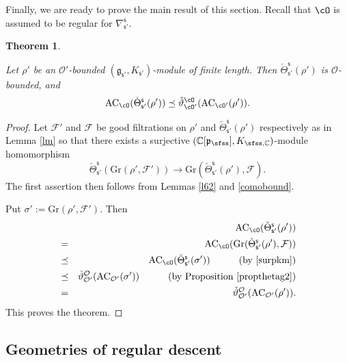 \documentclass[12pt,a4paper]{amsart}
\newcommand{\CF}{{\mathcal {F}}}
\newcommand{\CO}{{\mathcal {O}}}
\newcommand{\g}{\mathfrak g}
\newcommand{\p}{\mathfrak p}
\def\DD{\nabla}
\newcommand{\be}{\begin {equation}}
\newcommand{\ee}{\end {equation}}
\numberwithin{equation}{section}
\newtheorem{thm}{Theorem}[section]
\theoremstyle{remark}
\def\UU{\rU}
\def\cOp{\cO^{\prime}}
\begin{document}
Finally, we are ready to prove the main result of this section. Recall that  $\cO$ is assumed to be  regular  for $\DD_{\mathsf s'}^{\mathsf s}$.
\begin{thm}\label{prop:GDS.AC}

  Let $\rho'$ be an $\CO'$-bounded $(\g_{\mathsf s'}, K_{\mathsf s'})$-module of finite length. Then  $\check \Theta_{\mathsf s'}^{\mathsf s}(\rho')$ is $\CO$-bounded, and
    \[
    \mathrm{AC}_{\cO}(\check \Theta_{\mathsf s'}^{\mathsf s}(\rho'))\preceq \check \vartheta_{\cO'}^\cO(\mathrm{AC}_{\cO'}(\rho')).
  \]
\end{thm}
\begin{proof}
Let $\CF'$ and $\CF$ be  good filtrations  on $\rho'$ and  $\check \Theta_{\mathsf s'}^{\mathsf s}(\rho')$ respectively as in Lemma \ref{lm} so that there exists a
 surjective $(\C[\p_{\sfss}], K_{\sfss, \C})$-module homomorphism
\be\label{surpkm}
  \check \Theta_{\mathsf s'}^{\mathsf s}(\mathrm{Gr}(\rho',\CF')) \rightarrow \mathrm{Gr}(\check \Theta_{\mathsf s'}^{\mathsf s}(\rho'),\CF).
\ee
The first assertion then follows from Lemmas \ref{l62} and \ref{comobound}.

Put $\sigma':=\mathrm{Gr}(\rho',\CF')$.
Then
\begin{eqnarray*}
      && \mathrm{AC}_{\cO}(\check \Theta_{\mathsf s'}^{\mathsf s}(\rho'))\\
      &=&  \mathrm{AC}_{\cO}(\mathrm{Gr}(\check \Theta_{\mathsf s'}^{\mathsf s}(\rho'),\CF))\\
             &\preceq& \mathrm{AC}_{\cO}(\check \Theta_{\mathsf s'}^{\mathsf s}(\sigma')) \quad \qquad (\textrm{by \eqref{surpkm}})\\
          &  \preceq & \check \vartheta_{\CO'}^{\CO}(\mathrm{AC}_{\CO'}(\sigma'))\quad \qquad (\textrm{by Proposition \ref{propthetag2}})\\
               &=&\check \vartheta_{\CO'}^{\CO}(\mathrm{AC}_{\CO'}(\rho')).
               \end{eqnarray*}
This proves the theorem.
\end{proof}


\subsection{Geometries of regular descent}
\label{sec:GG}


\def\UU{{\bar \partial}}
\def\dbM{\breve{M}}
\def\dbMM{\breve{MM}}
\def\dbX{\breve{X}}
\def\dbfpp{\breve{\fpp}}
\def\ZdbX{\cZ_{\dbX}}
\def\aV{\acute{V}}
\def\fggs{\fgg_{\sfss}}
\def\fggsp{\fgg_{\sfss'}}
\def\fggspp{\fgg_{\sfss''}}
\def\fggspo{\fgg_{\sfss'_0}}
\def\fggspt{\fgg_{\sfss'_1}}
\def\fggspi{\fgg_{\sfss'_i}}
\def\fkks{\fkk_{\sfss}}
\def\fkksp{\fkk_{\sfss'}}
\def\fkkspo{\fkk_{\sfss'_0}}
\def\fkkspt{\fkk_{\sfss'_1}}
\def\fkkspi{\fkk_{\sfss'_i}}
\def\fpps{\fpp_{\sfss}}
\def\fppsp{\fpp_{\sfss'}}
\def\fppspo{\fpp_{\sfss'_0}}
\def\fppspt{\fpp_{\sfss'_1}}
\def\fppspi{\fpp_{\sfss'_i}}
\def\DDss{\DD_{\sfss'}^{\sfss}}
\def\DDsso{\DD_{\sfss'_0}^{\sfss}}
\def\cOpo{\cOp_{0}}
\def\Mss{M_{\sfss,\sfss'}}
\def\Ms{M_{\sfss}}
\def\Msp{M_{\sfss'}}
\end{document}
